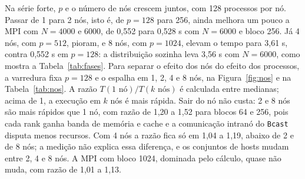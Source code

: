 \documentclass[Portugues]{ic-tese-v3}
\DeclareRobustCommand{\_}{\textunderscore\allowbreak} %
\begin{document}
Na série forte, $p$ e o número de nós crescem juntos, com 128 processos por nó. Passar de 1 para 2 nós, isto é, de $p=128$ para 256, ainda melhora um pouco a MPI com $N=4000$ e 6000, de 0,552 para 0,528 s com $N=6000$ e bloco 256. Já 4 nós, com $p=512$, pioram, e 8 nós, com $p=1024$, elevam o tempo para 3,61 s, contra 0,552 s em $p=128$: a distribuição sozinha leva 3,56 s com $N=6000$, como mostra a Tabela~\ref{tab:fases}. Para separar o efeito dos nós do efeito dos processos, a varredura fixa $p=128$ e o espalha em 1, 2, 4 e 8 nós, na Figura~\ref{fig:nos} e na Tabela~\ref{tab:nos}. A razão $T(1\text{ nó})/T(k\text{ nós})$ é calculada entre medianas; acima de 1, a execução em $k$ nós é mais rápida. Sair do nó não custa: 2 e 8 nós são mais rápidos que 1 nó, com razão de 1,20 a 1,52 para blocos 64 e 256, pois cada rank ganha banda de memória e cache e a comunicação intranó do \texttt{Bcast} disputa menos recursos. Com 4 nós a razão fica só em 1,04 a 1,19, abaixo de 2 e de 8 nós; a medição não explica essa diferença, e os conjuntos de hosts mudam entre 2, 4 e 8 nós. A MPI com bloco 1024, dominada pelo cálculo, quase não muda, com razão de 1,01 a 1,13.
\end{document}
